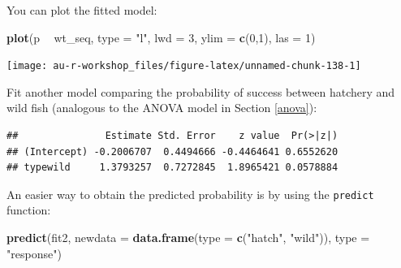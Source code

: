 \documentclass[]{book}
\newenvironment{Shaded}{\begin{snugshade}}{\end{snugshade}}
\newcommand{\DataTypeTok}[1]{\textcolor[rgb]{0.13,0.29,0.53}{#1}}
\newcommand{\DecValTok}[1]{\textcolor[rgb]{0.00,0.00,0.81}{#1}}
\newcommand{\KeywordTok}[1]{\textcolor[rgb]{0.13,0.29,0.53}{\textbf{#1}}}
\newcommand{\NormalTok}[1]{#1}
\newcommand{\OperatorTok}[1]{\textcolor[rgb]{0.81,0.36,0.00}{\textbf{#1}}}
\newcommand{\StringTok}[1]{\textcolor[rgb]{0.31,0.60,0.02}{#1}}
\begin{document}
You can plot the fitted model:

\begin{Shaded}
\begin{Highlighting}[]
\KeywordTok{plot}\NormalTok{(p }\OperatorTok{~}\StringTok{ }\NormalTok{wt_seq, }\DataTypeTok{type =} \StringTok{"l"}\NormalTok{, }\DataTypeTok{lwd =} \DecValTok{3}\NormalTok{, }\DataTypeTok{ylim =} \KeywordTok{c}\NormalTok{(}\DecValTok{0}\NormalTok{,}\DecValTok{1}\NormalTok{), }\DataTypeTok{las =} \DecValTok{1}\NormalTok{)}
\end{Highlighting}
\end{Shaded}

\begin{center}\texttt{[image: au-r-workshop\_files/figure-latex/unnamed-chunk-138-1]} \end{center}

Fit another model comparing the probability of success between hatchery and wild fish (analogous to the ANOVA model in Section \ref{anova}):

\begin{Shaded}
\end{Shaded}

\begin{verbatim}
##               Estimate Std. Error    z value  Pr(>|z|)
## (Intercept) -0.2006707  0.4494666 -0.4464641 0.6552620
## typewild     1.3793257  0.7272845  1.8965421 0.0578884
\end{verbatim}

An easier way to obtain the predicted probability is by using the \texttt{predict} function:

\begin{Shaded}
\begin{Highlighting}[]
\KeywordTok{predict}\NormalTok{(fit2,}
        \DataTypeTok{newdata =} \KeywordTok{data.frame}\NormalTok{(}\DataTypeTok{type =} \KeywordTok{c}\NormalTok{(}\StringTok{"hatch"}\NormalTok{, }\StringTok{"wild"}\NormalTok{)),}
        \DataTypeTok{type =} \StringTok{"response"}\NormalTok{)}
\end{Highlighting}
\end{Shaded}
\end{document}
